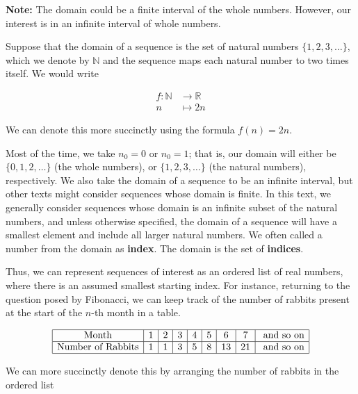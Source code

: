 \documentclass{ximera}
\begin{document}
\textbf{Note:}  The domain could be a finite interval of the whole numbers.  However, our interest is in an infinite interval of whole numbers. \\








\begin{example}
Suppose that the domain of a sequence is the set of natural numbers $\{1,2,3,\ldots\}$, which we denote by $\mathbb N$ and the sequence maps each natural number to two times itself.  We would write

\begin{align*}
f : \mathbb N & \to \mathbb R \\
    n &\mapsto 2n
\end{align*}

We can denote this more succinctly using the formula $f(n)=2n$.
\end{example}

Most of the time, we take $n_0=0$ or $n_0=1$; that is, our domain will either be $\{0,1,2,\ldots\}$ (the whole numbers), or $\{1,2,3,\ldots\}$ (the natural numbers), respectively.  We also take the domain of a sequence to be an infinite interval, but other texts might consider sequences whose domain is finite. In this text, we generally consider sequences whose domain is an infinite subset of the natural numbers, and unless otherwise specified, the domain of a sequence will have a smallest element and include all larger natural numbers.  We often called a number from the domain as \textbf{index}.  The domain is the set of \textbf{indices}.

Thus, we can represent sequences of interest as an ordered list of real numbers, where there is an assumed smallest starting index.  For instance, returning to the question posed by Fibonacci, we can keep track of the number of rabbits present at the start of the $n$-th month in a table.

\[
\begin{array}{| c | c | c | c | c | c| c| c| c| }
\hline
\textrm{Month} & 1 & 2 & 3 & 4 & 5 & 6 & 7 & \textrm{ and so on} \\
\hline
\textrm{Number of Rabbits} & 1 & 1 & 3 & 5 & 8 &13 &21 & \textrm{ and so on} \\
\hline
\end{array}
\]

We can more succinctly denote this by arranging the number of rabbits in the ordered list
\end{document}
